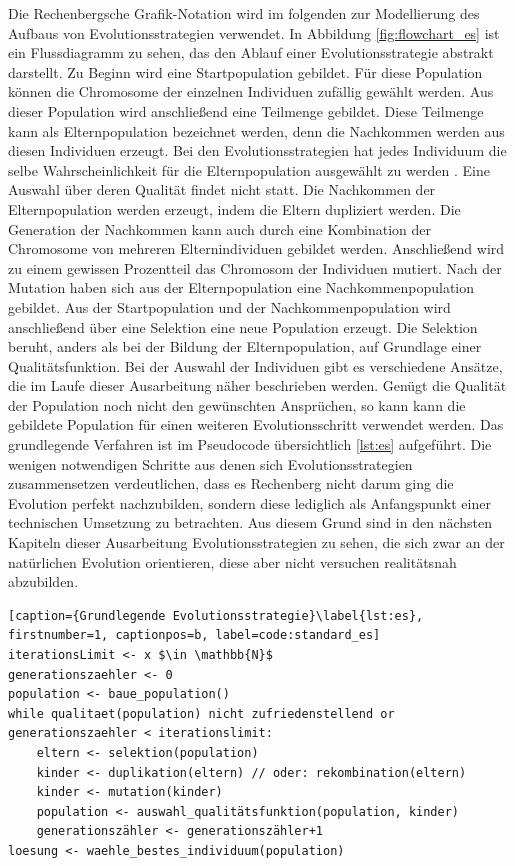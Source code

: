 Die Rechenbergsche Grafik-Notation wird im folgenden zur Modellierung des Aufbaus von Evolutionsstrategien verwendet. In Abbildung \ref{fig:flowchart_es} ist ein Flussdiagramm zu sehen, das den Ablauf einer Evolutionsstrategie abstrakt darstellt.
Zu Beginn wird eine Startpopulation gebildet. Für diese Population können die Chromosome der einzelnen Individuen zufällig gewählt werden. Aus dieser Population wird anschließend eine Teilmenge gebildet. Diese Teilmenge kann als Elternpopulation bezeichnet werden, denn die Nachkommen werden aus diesen Individuen erzeugt. Bei den Evolutionsstrategien hat jedes Individuum die selbe Wahrscheinlichkeit für die Elternpopulation ausgewählt zu werden \cite[S.220]{schoeneburg}. Eine Auswahl über deren Qualität findet nicht statt. Die Nachkommen der Elternpopulation werden erzeugt, indem die Eltern dupliziert werden. Die Generation der Nachkommen kann auch durch eine Kombination der Chromosome von mehreren Elternindividuen gebildet werden. Anschließend wird zu einem gewissen Prozentteil das Chromosom der Individuen mutiert. 
Nach der Mutation haben sich aus der Elternpopulation eine Nachkommenpopulation gebildet. Aus der Startpopulation und der Nachkommenpopulation wird anschließend über eine Selektion eine neue Population erzeugt. Die Selektion beruht, anders als bei der Bildung der Elternpopulation, auf Grundlage einer Qualitätsfunktion.
Bei der Auswahl der Individuen gibt es verschiedene Ansätze, die im Laufe dieser Ausarbeitung näher beschrieben werden. Genügt die Qualität der Population noch nicht den gewünschten Ansprüchen, so kann kann die gebildete Population für einen weiteren Evolutionsschritt verwendet werden.
Das grundlegende Verfahren ist im Pseudocode übersichtlich \ref{lst:es} aufgeführt. Die wenigen notwendigen Schritte aus denen sich Evolutionsstrategien zusammensetzen verdeutlichen, dass es Rechenberg nicht darum ging die Evolution perfekt nachzubilden, sondern diese lediglich als Anfangspunkt einer technischen Umsetzung zu betrachten. Aus diesem Grund sind in den nächsten Kapiteln dieser Ausarbeitung Evolutionsstrategien zu sehen, die sich zwar an der natürlichen Evolution orientieren, diese aber nicht versuchen realitätsnah abzubilden.
\begin{lstlisting}[caption={Grundlegende Evolutionsstrategie}\label{lst:es}, firstnumber=1, captionpos=b, label=code:standard_es]
iterationsLimit <- x $\in \mathbb{N}$
generationszaehler <- 0
population <- baue_population()
while qualitaet(population) nicht zufriedenstellend or generationszaehler < iterationslimit:
	eltern <- selektion(population)
	kinder <- duplikation(eltern) // oder: rekombination(eltern)
	kinder <- mutation(kinder)
	population <- auswahl_qualitätsfunktion(population, kinder)
	generationszähler <- generationszähler+1
loesung <- waehle_bestes_individuum(population)
\end{lstlisting}

